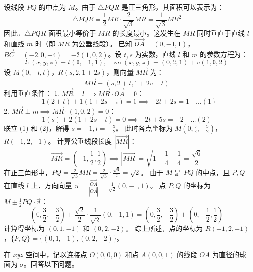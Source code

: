 \begin{questions}
\begin{solution}
设线段 $PQ$ 的中点为 $M$。由于 $\triangle PQR$ 是正三角形，其面积可以表示为：
\[
\triangle PQR = \frac{1}{2} MR \cdot \frac{2}{\sqrt{3}} MR = \frac{1}{\sqrt{3}} MR^2
\]
因此，$\triangle PQR$ 面积最小等价于 $MR$ 的长度最小。这发生在 $MR$ 同时垂直于直线 $l$ 和直线 $m$ 时（即 $MR$ 为公垂线段）。
已知 $\overrightarrow{OA} = (0, -1, 1)$，$\overrightarrow{BC} = (-2, 0, -4) = -2(1, 0, 2)$。设 $t, s$ 为实数，直线 $l$ 和 $m$ 的参数方程为：
\[
l : (x, y, z) = t(0, -1, 1), \quad m : (x, y, z) = (0, 2, 1) + s(1, 0, 2)
\]
设 $M(0, -t, t)$，$R(s, 2, 1 + 2s)$，则向量 $\overrightarrow{MR}$ 为：
\[
\overrightarrow{MR} = (s, 2 + t, 1 + 2s - t)
\]
利用垂直条件：
1. $\overrightarrow{MR} \perp l \implies \overrightarrow{MR} \cdot \overrightarrow{OA} = 0$：
\[
-1(2 + t) + 1(1 + 2s - t) = 0 \implies -2t + 2s = 1 \quad \dots (1)
\]
2. $\overrightarrow{MR} \perp m \implies \overrightarrow{MR} \cdot (1, 0, 2) = 0$：
\[
1(s) + 2(1 + 2s - t) = 0 \implies -2t + 5s = -2 \quad \dots (2)
\]
联立 (1) 和 (2)，解得 $s = -1, t = -\frac{3}{2}$。
此时各点坐标为 $M(0, \frac{3}{2}, -\frac{3}{2})$，$R(-1, 2, -1)$。
计算公垂线段长度 $|\overrightarrow{MR}|$：
\[
\overrightarrow{MR} = (-1, \frac{1}{2}, \frac{1}{2}) \implies |\overrightarrow{MR}| = \sqrt{1 + \frac{1}{4} + \frac{1}{4}} = \frac{\sqrt{6}}{2}
\]
在正三角形中，$PQ = \frac{2}{\sqrt{3}} MR = \frac{2}{\sqrt{3}} \cdot \frac{\sqrt{6}}{2} = \sqrt{2}$。
由于 $M$ 是 $PQ$ 的中点，且 $P, Q$ 在直线 $l$ 上，方向向量 $\vec{u} = \frac{\overrightarrow{OA}}{|\overrightarrow{OA}|} = \frac{1}{\sqrt{2}}(0, -1, 1)$。
点 $P, Q$ 的坐标为 $M \pm \frac{1}{2} PQ \cdot \vec{u}$：
\[
(0, \frac{3}{2}, -\frac{3}{2}) \pm \frac{\sqrt{2}}{2} \cdot \frac{1}{\sqrt{2}}(0, -1, 1) = (0, \frac{3}{2}, -\frac{3}{2}) \pm (0, -\frac{1}{2}, \frac{1}{2})
\]
计算得坐标为 $(0, 1, -1)$ 和 $(0, 2, -2)$。
综上所述，点的坐标为 $R(-1, 2, -1)$，$\{P, Q\} = \{(0, 1, -1), (0, 2, -2)\}$。
\end{solution}

\question
在 $xyz$ 空间中，记以连接点 $O(0, 0, 0)$ 和点 $A(0, 0, 1)$ 的线段 $OA$ 为直径的球面为 $\sigma$。回答以下问题。
\end{questions}
